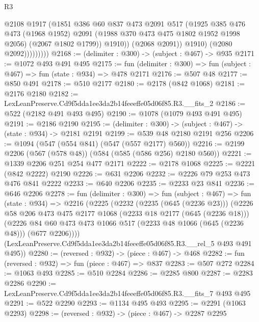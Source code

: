 \begin{lexlean}{R3}
\begin{coremodule}
                          @2108
                          @1917
                          (@1851
                            @386
                            @60
                            @837
                            @473
                            @2091
                            @517
                            (@1925
                              @385
                              @476
                              @473
                              (@1968 @1952)
                              @2091
                              (@1988 @370 @473 @475 @1802 @1952 @1998 @2056)
                              (@2067 @1802 @1799))
                            @1910))
                        (@2068 @2091))
                      @1910)
                    (@2080 @2092)))))))))
@2168 := (delimiter : @300) -> (subject : @467) -> @935
@2171 := @1072 @493 @491 @495
@2175 := fun (delimiter : @300) => fun (subject : @467) => fun (state : @934) => @478 @2171
@2176 := @507 @48
@2177 := @850 @491
@2178 := @510 @2177
@2180 := @2178 (@842 @1068)
@2181 := @2176 @2180
@2182 := LexLeanPreserve.Cd9f5dda1ee3da2b14feeeffe05d06f85.R3.__fits_2
@2186 := @522 (@2182 @491 @493 @495)
@2190 := @1078 (@1079 @493 @491 @495)
@2191 := @2186 @2190
@2195 := (delimiter : @300) -> (subject : @467) -> (state : @934) -> @2181 @2191
@2199 := @539 @48 @2180 @2191 @256
@2206 := @1094 (@547 (@554 @841) (@547 (@557 @2177) @560))
@2216 := @2199 @2206 (@567 (@578 @48)) (@584 (@585 (@586 @256) @2180 @560))
@2221 := @1339 @2206 @251 @254 @477 @2171
@2222 := @2178 @1068
@2225 := @2221 (@842 @2222) @2190
@2226 := @631 @2206
@2232 := @2226 @79 @253 @473 @476 @841 @2222
@2233 := @640 @2206
@2235 := @2233 @23 @841
@2236 := @646 @2206
@2278 := fun (delimiter : @300) =>
  fun (subject : @467) =>
  fun (state : @934) =>
  @2216
    (@2225
      (@2232
        (@2235 (@645 (@2236 @23)))
        (@2226
          @58
          @206
          @473
          @475
          @2177
          @1068
          (@2233 @18 @2177 (@645 (@2236 @18)))
          (@2226 @84 @60 @473 @473 @1066 @517 (@2233 @48 @1066 (@645 (@2236 @48))) (@677 @2206))))
      (LexLeanPreserve.Cd9f5dda1ee3da2b14feeeffe05d06f85.R3.__rel_5 @493 @491 @495))
@2280 := (reversed : @932) -> (piece : @467) -> @468
@2282 := fun (reversed : @932) => fun (piece : @467) => @837
@2283 := @507 @272
@2284 := @1063 @493
@2285 := @510 @2284
@2286 := @2285 @800
@2287 := @2283 @2286
@2290 := LexLeanPreserve.Cd9f5dda1ee3da2b14feeeffe05d06f85.R3.__fits_7 @493 @495
@2291 := @522 @2290
@2293 := @1134 @495 @493
@2295 := @2291 (@1063 @2293)
@2298 := (reversed : @932) -> (piece : @467) -> @2287 @2295

\end{coremodule}
\end{lexlean}
